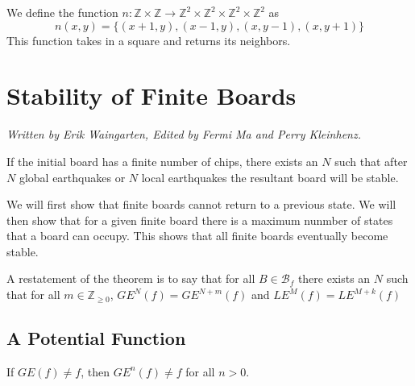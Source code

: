 \documentclass[runningheads,a4paper]{llncs}
\begin{document}
\begin{definition}
We define the function $n: \mathbb{Z} \times \mathbb{Z} \rightarrow \mathbb{Z}^2 \times \mathbb{Z}^2 \times \mathbb{Z}^2 \times \mathbb{Z}^2 $ as 
\begin{equation}
n(x,y) = \{ (x+1, y), (x-1, y), (x, y-1), (x, y+1) \}
\end{equation}
This function takes in a square and returns its neighbors. 
\end{definition}

\section{Stability of Finite Boards}
\label{Stability of Finite Boards}
\emph{Written by Erik Waingarten, Edited by Fermi Ma and Perry Kleinhenz.}

\begin{theorem}
\label{finitestability}
If the initial board has a finite number of chips, there exists an $N$ such that after $N$ global earthquakes or $N$ local earthquakes the resultant board will be stable.
\end{theorem}

We will first show that finite boards cannot return to a previous state. We will then show that for a given finite board there is a maximum nunmber of states that a board can occupy. This shows that all finite boards eventually become stable.

A restatement of the theorem is to say that for all $B \in \mathcal{B}_f$ there exists an $N$ such that for all $m \in \mathbb{Z}_{\geq 0}$, $GE^N(f) = GE^{N+m}(f)$ and $LE^{M}(f) = LE^{M+k}(f)$

\subsection{A Potential Function}
\begin{lemma}
If $GE(f) \neq f$, then $GE^n(f) \neq f$ for all $n > 0$.
\end{lemma}
\end{document}
